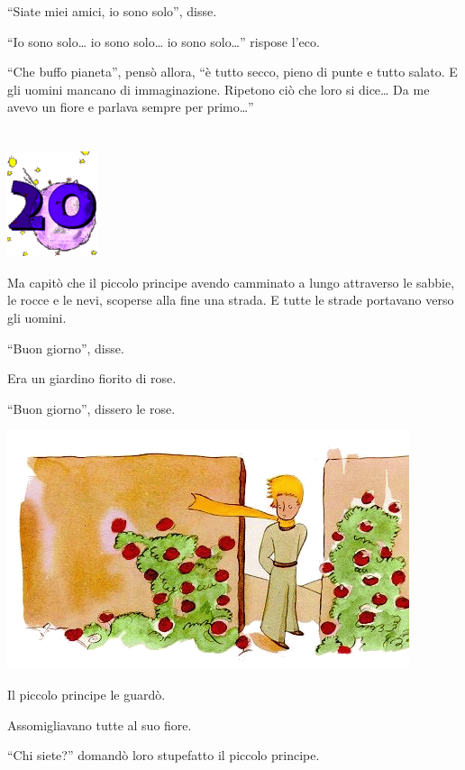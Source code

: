 \documentclass[11pt]{scrbook}
\begin{document}
``Siate miei amici, io sono solo'', disse.

``Io sono solo\ldots{} io sono solo\ldots{} io sono solo\ldots{}'' rispose l'eco.

``Che buffo pianeta'', pensò allora, ``è tutto secco, pieno di punte e tutto salato. E gli uomini mancano di immaginazione. Ripetono ciò che loro si dice\ldots{} Da me avevo un fiore e parlava sempre per primo\ldots{}''

\chapter{}
\begin{center}
\includegraphics{img/chapter20}
\end{center}

Ma capitò che il piccolo principe avendo camminato a lungo attraverso le sabbie, le rocce e le nevi, scoperse alla fine una strada. E tutte le strade portavano verso gli uomini.

``Buon giorno'', disse.

Era un giardino fiorito di rose.

``Buon giorno'', dissero le rose.

\begin{center}
\includegraphics{img/20a}
\end{center}

Il piccolo principe le guardò.

Assomigliavano tutte al suo fiore.

``Chi siete?'' domandò loro stupefatto il piccolo principe.
\end{document}
